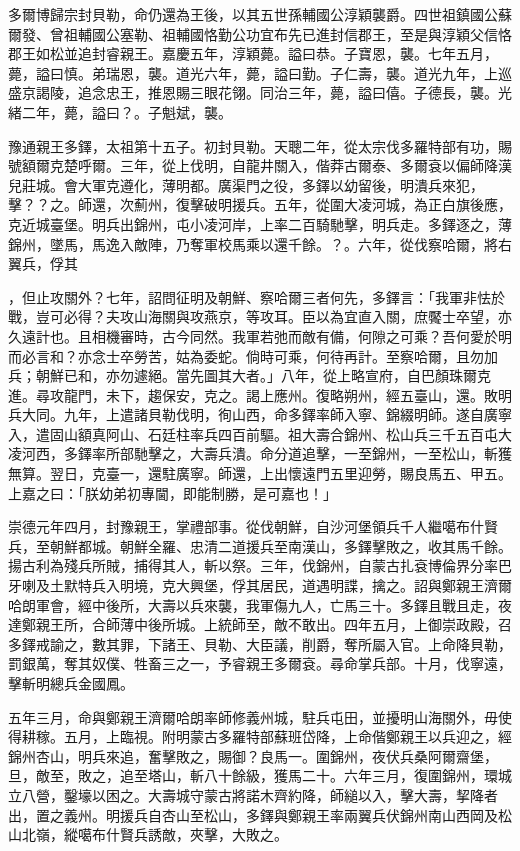 \begin{pinyinscope}
多爾博歸宗封貝勒，命仍還為王後，以其五世孫輔國公淳穎襲爵。四世祖鎮國公蘇爾發、曾祖輔國公塞勒、祖輔國恪勤公功宜布先已進封信郡王，至是與淳穎父信恪郡王如松並追封睿親王。嘉慶五年，淳穎薨。謚曰恭。子寶恩，襲。七年五月，薨，謚曰慎。弟瑞恩，襲。道光六年，薨，謚曰勤。子仁壽，襲。道光九年，上巡盛京謁陵，追念忠王，推恩賜三眼花翎。同治三年，薨，謚曰僖。子德長，襲。光緒二年，薨，謚曰？。子魁斌，襲。

豫通親王多鐸，太祖第十五子。初封貝勒。天聰二年，從太宗伐多羅特部有功，賜號額爾克楚呼爾。三年，從上伐明，自龍井關入，偕莽古爾泰、多爾袞以偏師降漢兒莊城。會大軍克遵化，薄明都。廣渠門之役，多鐸以幼留後，明潰兵來犯，擊？？之。師還，次薊州，復擊破明援兵。五年，從圍大凌河城，為正白旗後應，克近城臺堡。明兵出錦州，屯小凌河岸，上率二百騎馳擊，明兵走。多鐸逐之，薄錦州，墜馬，馬逸入敵陣，乃奪軍校馬乘以還千餘。？。六年，從伐察哈爾，將右翼兵，俘其

，但止攻關外？七年，詔問征明及朝鮮、察哈爾三者何先，多鐸言：「我軍非怯於戰，豈可必得？夫攻山海關與攻燕京，等攻耳。臣以為宜直入關，庶饜士卒望，亦久遠計也。且相機審時，古今同然。我軍若弛而敵有備，何隙之可乘？吾何愛於明而必言和？亦念士卒勞苦，姑為委蛇。倘時可乘，何待再計。至察哈爾，且勿加兵；朝鮮已和，亦勿遽絕。當先圖其大者。」八年，從上略宣府，自巴顏珠爾克進。尋攻龍門，未下，趨保安，克之。謁上應州。復略朔州，經五臺山，還。敗明兵大同。九年，上遣諸貝勒伐明，徇山西，命多鐸率師入寧、錦綴明師。遂自廣寧入，遣固山額真阿山、石廷柱率兵四百前驅。祖大壽合錦州、松山兵三千五百屯大凌河西，多鐸率所部馳擊之，大壽兵潰。命分道追擊，一至錦州，一至松山，斬獲無算。翌日，克臺一，還駐廣寧。師還，上出懷遠門五里迎勞，賜良馬五、甲五。上嘉之曰：「朕幼弟初專閫，即能制勝，是可嘉也！」

崇德元年四月，封豫親王，掌禮部事。從伐朝鮮，自沙河堡領兵千人繼噶布什賢兵，至朝鮮都城。朝鮮全羅、忠清二道援兵至南漢山，多鐸擊敗之，收其馬千餘。揚古利為殘兵所賊，捕得其人，斬以祭。三年，伐錦州，自蒙古扎袞博倫界分率巴牙喇及土默特兵入明境，克大興堡，俘其居民，道遇明諜，擒之。詔與鄭親王濟爾哈朗軍會，經中後所，大壽以兵來襲，我軍傷九人，亡馬三十。多鐸且戰且走，夜達鄭親王所，合師薄中後所城。上統師至，敵不敢出。四年五月，上御崇政殿，召多鐸戒諭之，數其罪，下諸王、貝勒、大臣議，削爵，奪所屬入官。上命降貝勒，罰銀萬，奪其奴僕、牲畜三之一，予睿親王多爾袞。尋命掌兵部。十月，伐寧遠，擊斬明總兵金國鳳。

五年三月，命與鄭親王濟爾哈朗率師修義州城，駐兵屯田，並擾明山海關外，毋使得耕稼。五月，上臨視。附明蒙古多羅特部蘇班岱降，上命偕鄭親王以兵迎之，經錦州杏山，明兵來追，奮擊敗之，賜御？良馬一。圍錦州，夜伏兵桑阿爾齋堡，旦，敵至，敗之，追至塔山，斬八十餘級，獲馬二十。六年三月，復圍錦州，環城立八營，鑿壕以困之。大壽城守蒙古將諾木齊約降，師縋以入，擊大壽，挈降者出，置之義州。明援兵自杏山至松山，多鐸與鄭親王率兩翼兵伏錦州南山西岡及松山北嶺，縱噶布什賢兵誘敵，夾擊，大敗之。


\end{pinyinscope}
